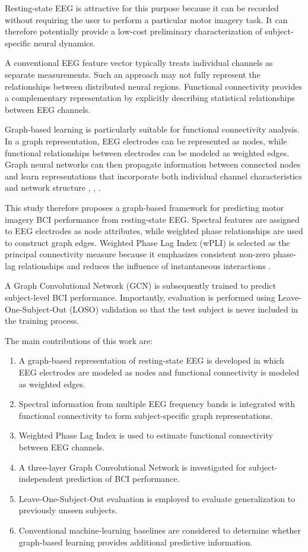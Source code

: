 \documentclass[conference]{IEEEtran}
\begin{document}
Resting-state EEG is attractive for this purpose because it can be recorded without requiring the user to perform a particular motor imagery task. It can therefore potentially provide a low-cost preliminary characterization of subject-specific neural dynamics.

A conventional EEG feature vector typically treats individual channels as separate measurements. Such an approach may not fully represent the relationships between distributed neural regions. Functional connectivity provides a complementary representation by explicitly describing statistical relationships between EEG channels.

Graph-based learning is particularly suitable for functional connectivity analysis. In a graph representation, EEG electrodes can be represented as nodes, while functional relationships between electrodes can be modeled as weighted edges. Graph neural networks can then propagate information between connected nodes and learn representations that incorporate both individual channel characteristics and network structure \cite{kipf2017}, \cite{velickovic2018}, \cite{hamilton2017}.

This study therefore proposes a graph-based framework for predicting motor imagery BCI performance from resting-state EEG. Spectral features are assigned to EEG electrodes as node attributes, while weighted phase relationships are used to construct graph edges. Weighted Phase Lag Index (wPLI) is selected as the principal connectivity measure because it emphasizes consistent non-zero phase-lag relationships and reduces the influence of instantaneous interactions \cite{vinck2011}.

A Graph Convolutional Network (GCN) is subsequently trained to predict subject-level BCI performance. Importantly, evaluation is performed using Leave-One-Subject-Out (LOSO) validation so that the test subject is never included in the training process.

The main contributions of this work are:
\begin{enumerate}
\item A graph-based representation of resting-state EEG is developed in which EEG electrodes are modeled as nodes and functional connectivity is modeled as weighted edges.
\item Spectral information from multiple EEG frequency bands is integrated with functional connectivity to form subject-specific graph representations.
\item Weighted Phase Lag Index is used to estimate functional connectivity between EEG channels.
\item A three-layer Graph Convolutional Network is investigated for subject-independent prediction of BCI performance.
\item Leave-One-Subject-Out evaluation is employed to evaluate generalization to previously unseen subjects.
\item Conventional machine-learning baselines are considered to determine whether graph-based learning provides additional predictive information.
\end{enumerate}
\end{document}
